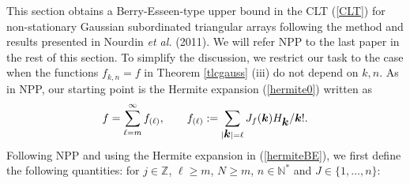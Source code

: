 \documentclass[10pt]{article}
\def\N{\mathbb{N}}
\def\Z{\mathbb{Z}}
\newcommand{\mbf}[1]{\mbox{\boldmath $#1$}}
\begin{document}
This section obtains a Berry-Esseen-type upper bound in the
CLT (\ref{CLT}) for non-stationary Gaussian subordinated triangular arrays
following %
the method and results presented in
Nourdin {\it et al.} (2011).
We will refer NPP to the last paper  in the rest of this section.
To simplify the discussion,
we restrict our task to the case when the functions $f_{k,n} = f$  in
Theorem \ref{tlcgauss} (iii) do not depend on $k, n$.
As in NPP, our starting point is the Hermite expansion (\ref{hermite0}) written as
\begin{equation} \label{hermiteBE}
f = \sum_{\ell = m}^\infty f_{(\ell)}, \qquad f_{(\ell) } :=  \sum_{|{\mbf k}|= \ell} J_f({\mbf k}) H_{\mbf k}/{\mbf k}!.
\end{equation}
Following NPP and using the Hermite expansion in (\ref{hermiteBE}),
we first define  the following quantities: %
for $j\in \Z$, $\ell\geq m$, $N\geq m$, $n\in \N^*$ and $J\in \{1,\dots,n\}$:
\end{document}
